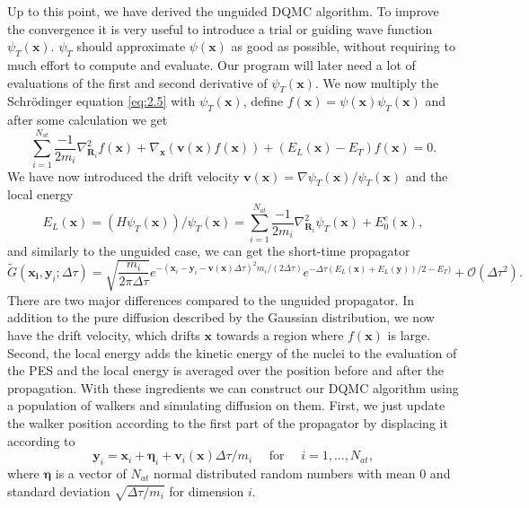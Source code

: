 \documentclass [12pt]{report}
\begin{document}
Up to this point, we have derived the unguided DQMC algorithm. To improve the convergence it is very useful to introduce a trial or guiding wave function $\psi_T(\bm{x})$. $\psi_T$ should approximate $\psi(\bm{x})$ as good as possible, without requiring to much effort to compute and evaluate. Our program will later need a lot of evaluations of the first and second derivative of $\psi_T(\bm{x})$. We now multiply the Schrödinger equation \eqref{eq:2.5} with $\psi_T(\bm{x})$, define $f(\bm{x}) = \psi(\bm{x}) \psi_T(\bm{x})$ and after some calculation \cite{cyrus2} we get
\begin{equation} \label{eq:2.8}
\sum_{i=1}^{N_{at}} \frac{-1}{2m_i} \nabla^2_{\bm{R}_i} f(\bm{x}) + \nabla_{\bm{x}} (\bm{v}(\bm{x}) f(\bm{x})) + (E_L(\bm{x}) - E_T)f(\bm{x}) = 0.
\end{equation}
We have now introduced the drift velocity $\bm{v}(\bm{x}) = \nabla \psi_T(\bm{x})/ \psi_T(\bm{x})$ and the local energy 
\begin{equation}\label{el}
E_L(\bm{x}) = (H\psi_T(\bm{x}))/\psi_T(\bm{x}) = \sum_{i=1}^{N_{at}} \frac{-1}{2m_i} \nabla^2_{\bm{R}_i} \psi_T(\bm{x}) + E_0^e(\bm{x}),
\end{equation}
and similarly to the unguided case, we can get the short-time propagator
\begin{equation} \label{eq:2.9}
\tilde{G}(\bm{x_i},\bm{y}_i;\Delta \tau) = \sqrt{\frac{m_i}{2 \pi \Delta \tau}} e^{-(\bm{x}_i-\bm{y}_i-\bm{v}(\bm{x})\Delta \tau)^2 m_i/(2 \Delta \tau)} e^{-\Delta \tau (E_L(\bm{x})+E_L(\bm{y}))/2 - E_T)} + \mathcal{O}(\Delta \tau^2).
\end{equation}
There are two major differences compared to the unguided propagator. In addition to the pure diffusion described by the Gaussian distribution, we now have the drift velocity, which drifts $\bm{x}$ towards a region where $f(\bm{x})$ is large. Second, the local energy adds the kinetic energy of the nuclei to the evaluation of the PES and the local energy is averaged over the position before and after the propagation. 
With these ingredients we can construct our DQMC algorithm using a population of walkers and simulating diffusion on them. First, we just update the walker position according to the first part of the propagator by displacing it according to
\begin{equation}\label{eq:2.10}
\bm{y}_i = \bm{x}_i + \bm{\eta}_i + \bm{v}_i(\bm{x})\Delta \tau/m_i \quad \textrm{ for } \quad i=1,...,N_{at},
\end{equation}
where $\bm{\eta}$ is a vector of $N_{at}$ normal distributed random numbers with mean $0$ and standard deviation $\sqrt{\Delta \tau / m_i}$ for dimension $i$.
\end{document}
